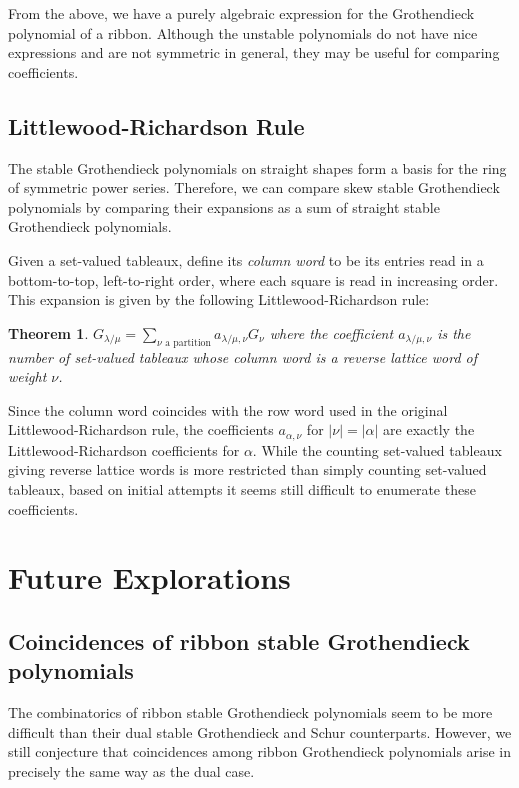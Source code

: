 \documentclass[12pt]{amsart}
\newtheorem{thm}{Theorem}[section]
\theoremstyle{definition}
\begin{document}
From the above, we have a purely algebraic expression for the Grothendieck polynomial of a ribbon. Although the unstable polynomials do not have nice expressions and are not symmetric in general, they may be useful for comparing coefficients. 


\subsection{Littlewood-Richardson Rule}

The stable Grothendieck polynomials on straight shapes form a basis for the ring of symmetric power series. Therefore, we can compare skew stable Grothendieck polynomials by comparing their expansions as a sum of straight stable Grothendieck polynomials.

Given a set-valued tableaux, define its \textit{column word} to be its entries read in a bottom-to-top, left-to-right order, where each square is read in increasing order. This expansion is given by the following Littlewood-Richardson rule:

\begin{thm} \cite{buch2002lrrule}
$G_{\lambda/\mu} = \sum_{\nu \text{ a partition}} a_{\lambda/\mu, \nu} G_\nu$ where the coefficient $a_{\lambda/\mu, \nu}$ is the number of set-valued tableaux whose column word is a reverse lattice word of weight $\nu$. 
\end{thm}

Since the column word coincides with the row word used in the original Littlewood-Richardson rule, the coefficients $a_{\alpha, \nu}$ for $|\nu| = |\alpha|$ are exactly the Littlewood-Richardson coefficients for $\alpha$. While the counting set-valued tableaux giving reverse lattice words is more restricted than simply counting set-valued tableaux, based on initial attempts it seems still difficult to enumerate these coefficients.
\fi



\section{Future Explorations}
\subsection{Coincidences of ribbon stable Grothendieck polynomials}

The combinatorics of ribbon stable Grothendieck polynomials seem to be more difficult than their dual stable Grothendieck and Schur counterparts. However, we still conjecture that coincidences among ribbon Grothendieck polynomials arise in precisely the same way as the dual case. 
\end{document}
